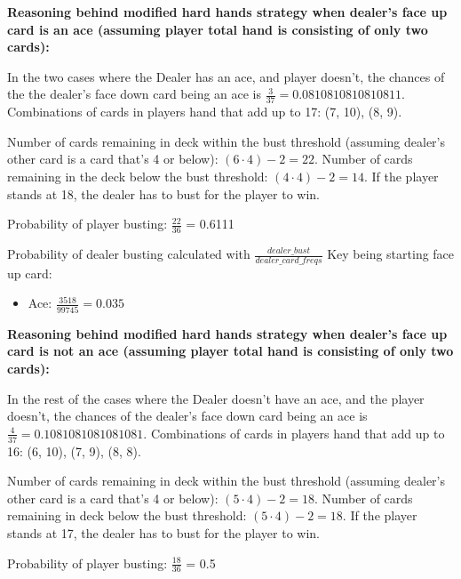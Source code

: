 \documentclass{article}
\begin{document}
		{\parindent0pt %
        

        \textbf{Reasoning behind modified hard hands strategy when dealer's face up card is an ace (assuming player total hand is consisting of only two cards):}

        

        In the two cases where the Dealer has an ace, and player doesn't, the chances of the the dealer's face down card being an ace is $\frac{3}{37} = 0.0810810810810811$. Combinations of cards in players hand that add up to 17: (7, 10), (8, 9).

        
        
        Number of cards remaining in deck within the bust threshold (assuming dealer's other card is a card that's 4 or below): $(6 \cdot 4) - 2 = 22$. Number of cards remaining in the deck below the bust threshold: $(4 \cdot 4) - 2 = 14$. If the player stands at 18, the dealer has to bust for the player to win.
        
        
        
        Probability of player busting: $\frac{22}{36}$ = 0.6111

        

        Probability of dealer busting calculated with $\frac{dealer\_bust}{dealer\_card\_freqs}$ Key being starting face up card:
        \begin{itemize}
            \item Ace: $\frac{3518}{99745} = 0.035$
        \end{itemize}

        

        \textbf{Reasoning behind modified hard hands strategy when dealer's face up card is not an ace (assuming player total hand is consisting of only two cards):}

        

        In the rest of the cases where the Dealer doesn't have an ace, and the player doesn't, the chances of the dealer's face down card being an ace is $\frac{4}{37} = 0.1081081081081081$. Combinations of cards in players hand that add up to 16: (6, 10), (7, 9), (8, 8).

        
        
         Number of cards remaining in deck within the bust threshold (assuming dealer's other card is a card that's 4 or below): $(5 \cdot 4) - 2 = 18$. Number of cards remaining in deck below the bust threshold: $(5 \cdot 4) - 2 = 18$. If the player stands at 17, the dealer has to bust for the player to win.
        
        
        
        Probability of player busting: $\frac{18}{36}$ = 0.5

        

		}
\end{document}
